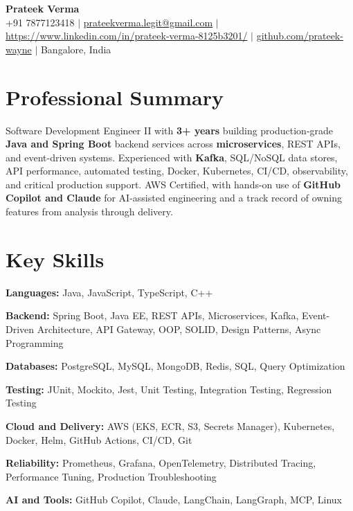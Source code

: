\documentclass[letterpaper,10.5pt]{article}
\begin{document}
\begin{center}
  {\LARGE \textbf{Prateek Verma}} \\[2pt]
  +91 7877123418 \;$|$\;
  \href{mailto:prateekverma.legit@gmail.com}{prateekverma.legit@gmail.com} \;$|$\;
  \href{linkedin}{https://www.linkedin.com/in/prateek-verma-8125b3201/} \;$|$\;
  \href{https://github.com/Prateek-Wayne}{github.com/prateek-wayne} \;$|$\;
  Bangalore, India
\end{center}

\section{Professional Summary}
\small{
Software Development Engineer II with \textbf{3+ years} building production-grade \textbf{Java and Spring Boot} backend services across \textbf{microservices}, REST APIs, and event-driven systems. Experienced with \textbf{Kafka}, SQL/NoSQL data stores, API performance, automated testing, Docker, Kubernetes, CI/CD, observability, and critical production support. AWS Certified, with hands-on use of \textbf{GitHub Copilot and Claude} for AI-assisted engineering and a track record of owning features from analysis through delivery.
}

\section{Key Skills}
\begin{itemize}[leftmargin=0.15in, label={}, itemsep=-1pt]
  \small{
    \item \textbf{Languages:} Java, JavaScript, TypeScript, C++
    \item \textbf{Backend:} Spring Boot, Java EE, REST APIs, Microservices, Kafka, Event-Driven Architecture, API Gateway, OOP, SOLID, Design Patterns, Async Programming
    \item \textbf{Databases:} PostgreSQL, MySQL, MongoDB, Redis, SQL, Query Optimization
    \item \textbf{Testing:} JUnit, Mockito, Jest, Unit Testing, Integration Testing, Regression Testing
    \item \textbf{Cloud and Delivery:} AWS (EKS, ECR, S3, Secrets Manager), Kubernetes, Docker, Helm, GitHub Actions, CI/CD, Git
    \item \textbf{Reliability:} Prometheus, Grafana, OpenTelemetry, Distributed Tracing, Performance Tuning, Production Troubleshooting
    \item \textbf{AI and Tools:} GitHub Copilot, Claude, LangChain, LangGraph, MCP, Linux
  }
\end{itemize}
\end{document}
